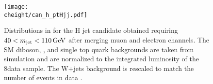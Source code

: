 \begin{figure}[!htb]
\centering
\texttt{[image: \\cheight/can\_h\_ptHjj.pdf]}
\caption{Distributions in \pt for the H jet candidate obtained requiring $40 < m_{\text{jet}} < 110\,\text{Ge\hspace{-.08em}V}$ after merging muon and electron channels. The SM diboson, \ttbar, and single top quark backgrounds are taken from simulation and are normalized to the integrated luminosity of the 8\TeV data sample. The W+jets background is rescaled to match the number of events in data .}
\label{fig:controlPlots8TeV}
\end{figure}